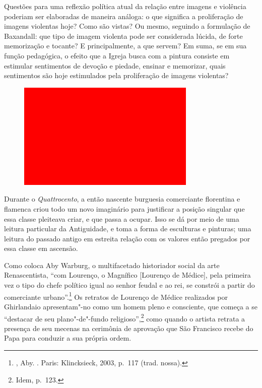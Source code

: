 Questões para uma reflexão política atual da relação entre imagens e
violência poderiam ser elaboradas de maneira análoga: o que significa a
proliferação de imagens violentas hoje? Como são vistas? Ou mesmo,
seguindo a formulação de Baxandall: que tipo de imagem violenta pode ser
considerada lúcida, de forte memorização e tocante? E principalmente, a
que servem? Em suma, se em sua função pedagógica, o efeito que a Igreja
busca com a pintura consiste em estimular sentimentos de devoção e
piedade, ensinar e memorizar, quais sentimentos são hoje estimulados
pela proliferação de imagens violentas?


\begin{figure}[!ht]
\centering
 \includegraphics[width=85mm]{./imgs/im1.jpg}
\caption{\footnotesize{}}
\end{figure}

\asterisc

Durante o \emph{Quattrocento}, a então nascente burguesia comerciante
florentina e flamenca criou todo um novo imaginário para justificar a
posição singular que essa classe pleiteava criar, e que passa a ocupar.
Isso se dá por meio de uma leitura particular da Antiguidade, e toma a
forma de esculturas e pinturas; uma leitura do passado antigo em
estreita relação com os valores então pregados por essa classe em
ascensão.

Como coloca Aby Warburg, o multifacetado historiador social da arte
Renascentista, ``com Lourenço, o Magnífico {[}Lourenço de
Médice{]}, pela primeira vez o tipo do chefe político igual ao senhor
feudal e ao rei, se constrói a partir do comerciante urbano''.\footnote{, Aby. {}. Paris: Klincksieck, 2003, p.~117 (trad. nossa).}
Os retratos de Lourenço de Médice realizados por Ghirlandaio
apresentam"-no como um homem pleno e consciente, que começa a se
``destacar de seu plano"-de"-fundo religioso'',\footnote{Idem, p.~123.}
como quando o artista retrata a presença de seu mecenas na cerimônia de
aprovação que São Francisco recebe do Papa para conduzir a sua própria
ordem.

